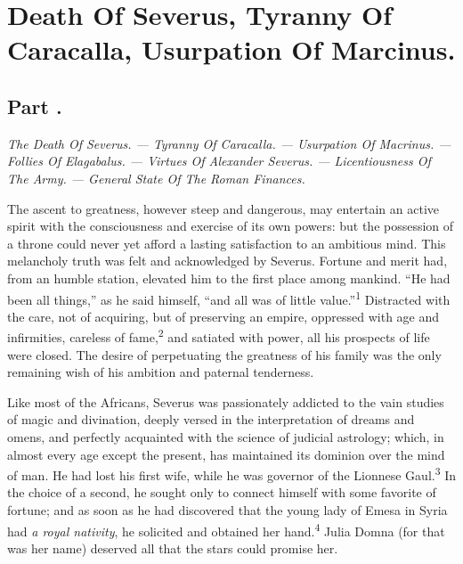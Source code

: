 \chapter{Death Of Severus, Tyranny Of Caracalla, Usurpation Of Marcinus.}
\section{Part \thesection.}

\textit{The Death Of Severus. — Tyranny Of Caracalla. — Usurpation Of
Macrinus. — Follies Of Elagabalus. — Virtues Of Alexander
Severus. — Licentiousness Of The Army. — General State Of The Roman
Finances.}
\vspace{\onelineskip}

The ascent to greatness, however steep and dangerous, may
entertain an active spirit with the consciousness and exercise of
its own powers: but the possession of a throne could never yet
afford a lasting satisfaction to an ambitious mind. This
melancholy truth was felt and acknowledged by Severus. Fortune
and merit had, from an humble station, elevated him to the first
place among mankind. “He had been all things,” as he said
himself, “and all was of little value.”\textsuperscript{1} Distracted with the
care, not of acquiring, but of preserving an empire, oppressed
with age and infirmities, careless of fame,\textsuperscript{2} and satiated with
power, all his prospects of life were closed. The desire of
perpetuating the greatness of his family was the only remaining
wish of his ambition and paternal tenderness.



Like most of the Africans, Severus was passionately addicted to
the vain studies of magic and divination, deeply versed in the
interpretation of dreams and omens, and perfectly acquainted with
the science of judicial astrology; which, in almost every age
except the present, has maintained its dominion over the mind of
man. He had lost his first wife, while he was governor of the
Lionnese Gaul.\textsuperscript{3} In the choice of a second, he sought only to
connect himself with some favorite of fortune; and as soon as he
had discovered that the young lady of Emesa in Syria had \textit{a royal
nativity}, he solicited and obtained her hand.\textsuperscript{4} Julia Domna (for
that was her name) deserved all that the stars could promise her.

